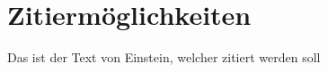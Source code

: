 \Author{\daAuthorOne}  %

\section{Zitiermöglichkeiten}

Das ist der Text von Einstein, welcher zitiert werden soll \autocite{einstein}

